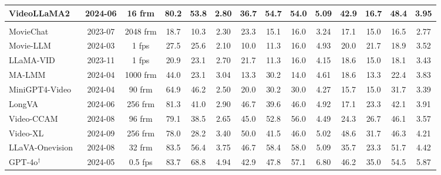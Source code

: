 \begin{table*}[t]
{\begin{tabular}{lccccccccccccc}
           \rowcolor[HTML]{FFF5F5}VideoLLaMA2~\cite{cheng2024videollama2} &2024-06 &16 frm   & 80.2 & 53.8 & 2.80  & 36.7  & 54.7  & 54.0  & 5.09  & 42.9 & 16.7 & 48.4 & 3.95  \\
        \hline
        \rowcolor[HTML]{F1F6EC}\multicolumn{14}{l}{\gray{\textit{\textbf{Long Video MLLMs}}}}\\
         \rowcolor[HTML]{F1F6EC}MovieChat~\cite{moviechat2023} &2023-07 &2048 frm   & 18.7 & 10.3 & 2.30  & 23.3  & 15.1  & 16.0  & 3.24  & 17.1 & 15.0 & 16.5 & 2.77    \\
         \rowcolor[HTML]{F1F6EC}Movie-LLM~\cite{moviellm2024} &2024-03 &1 fps  & 27.5 & 25.6 & 2.10  & 10.0  & 11.3  & 16.0  & 4.93  & 20.0 & 21.7 & 18.9 & 3.52   \\
        \rowcolor[HTML]{F1F6EC}LLaMA-VID~\cite{llama-vid2023} &2023-11 &1 fps  & 20.9 & 23.1 & 2.70  & 21.7  & 11.3  & 16.0  & 4.15  & 18.6 & 15.0 & 18.1 & 3.43  \\
        \rowcolor[HTML]{F1F6EC}MA-LMM~\cite{malmm2024} &2024-04 &1000 frm & 44.0 & 23.1 & 3.04  & 13.3  & 30.2  & 14.0  & 4.61  & 18.6 & 13.3 & 22.4 & 3.83   \\
          \rowcolor[HTML]{F1F6EC}
        MiniGPT4-Video~\cite{minigpt4video-2024} &2024-04 &90 frm  & 64.9 & 46.2 & 2.50  & 20.0  & 30.2  & 30.0  & 4.27  & 15.7 & 15.0 & 31.7 & 3.39   \\
          \rowcolor[HTML]{F1F6EC}
        LongVA~\cite{zhang2024longva} &2024-06 &256 frm  & 81.3 & 41.0 & 2.90  & 46.7  & 39.6  & 46.0  & 4.92  & 17.1 & 23.3 & 42.1 & 3.91   \\
          \rowcolor[HTML]{F1F6EC}
        Video-CCAM~\cite{fei2024videoccam} &2024-08 &96 frm  & 79.1 & 38.5 & 2.65  & 45.0  & 52.8  & 56.0  & 4.49  & 24.3 & 26.7 & 46.1& 3.57   \\
          \rowcolor[HTML]{F1F6EC}
        Video-XL~\cite{shu2024videoxl} &2024-09 &256 frm  & 78.0 & 28.2 & 3.40  & 50.0  & 41.5  & 46.0  & 5.02  & 48.6 & 31.7 & 46.3 & 4.21   \\
          \rowcolor[HTML]{F1F6EC}
        LLaVA-Onevision~\cite{li2024llavaonevision} &2024-08 &32 frm  & 83.5 & 56.4 & 3.75  & 46.7  & 58.4  & 58.0  & 5.09  & 35.7 & 23.3 & 51.7 & 4.42   \\
        \rowcolor[HTML]{F1F6EC}GPT-4o$^\dag$~\cite{gpt4o}  &2024-05 &0.5 fps  & 83.7 & 68.8 & 4.94  & 42.9  & 47.8  & 57.1  & 6.80  & 46.2 & 35.0 & 54.5 & 5.87  \\
\bottomrule
 \end{tabular}
}
\vspace{-0.2cm}

\end{table*}
